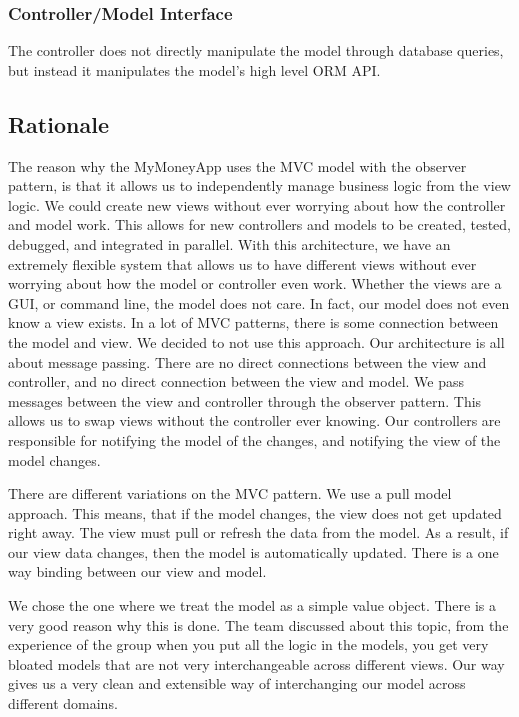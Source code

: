 \documentclass[12pt]{article}
\begin{document}
\subsubsection{Controller/Model Interface}

The controller does not directly manipulate the model through database queries, but instead it manipulates the model’s high level ORM API.

\subsection{Rationale}
The reason why the MyMoneyApp uses the MVC model with the observer pattern, is that it allows us to independently manage business logic from the view logic. We could create new views without ever worrying about how the controller and model work. This allows for new controllers and models to be created, tested, debugged, and integrated in parallel. With this architecture, we have an extremely flexible system that allows us to have different views without ever worrying about how the model or controller even work. Whether the views are a GUI, or command line, the model does not care. In fact, our model does not even know a view exists. In a lot of MVC patterns, there is some connection between the model and view. We decided to not use this approach. Our architecture is all about message passing. There are no direct connections between the view and controller, and no direct connection between the view and model. We pass messages between the view and controller through the observer pattern. This allows us to swap views without the controller ever knowing. Our controllers are responsible for notifying the model of the changes, and notifying the view of the model changes.

There are different variations on the MVC pattern. We use a pull model approach. This means, that if the model changes, the view does not get updated right away. The view must pull or refresh the data from the model. As a result, if our view data changes, then the model is automatically updated. There is a one way binding between our view and model.

We chose the one where we treat the model as a simple value object. There is a very good reason why this is done. The team discussed about this topic, from the experience of the group when you put all the logic in the models, you get very bloated models that are not very interchangeable across different views. Our way gives us a very clean and extensible way of interchanging our model across different domains. 
\end{document}

